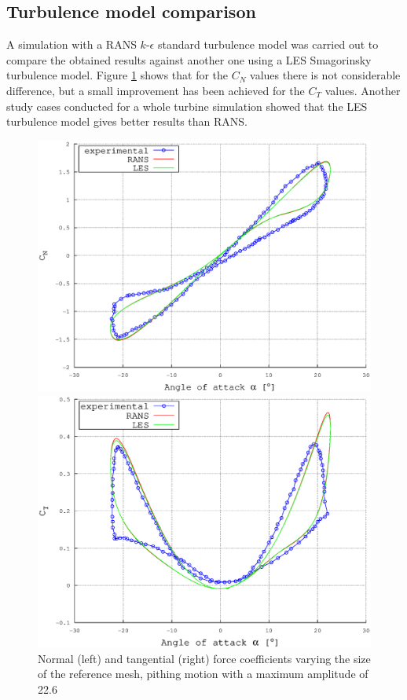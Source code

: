 \documentclass[a4paper]{jpconf}
\begin{document}
\subsection{Turbulence model comparison}
A simulation with a RANS $k$-$\epsilon$ standard turbulence model was carried out to compare the obtained results against another one using a LES Smagorinsky turbulence model. Figure \ref{RANSLES} shows that for the $C_N$ values there is not considerable difference, but a small improvement has been achieved for the $C_T$ values. Another study cases conducted for a whole turbine simulation showed that the LES turbulence model gives better results than RANS. 

\begin{figure}[h]
\begin{minipage}{18pc}
\includegraphics[width=\columnwidth]{CNRANSLES.eps}
\end{minipage}\hspace{2pc}%
\begin{minipage}{18pc}
\includegraphics[width=\columnwidth]{CTRANSLES.eps}
\end{minipage} 
\caption{\label{RANSLES}Normal (left) and tangential (right) force coefficients varying the size of the reference mesh, pithing motion with a maximum amplitude of 22.6\degree\ }
\end{figure}
\end{document}
